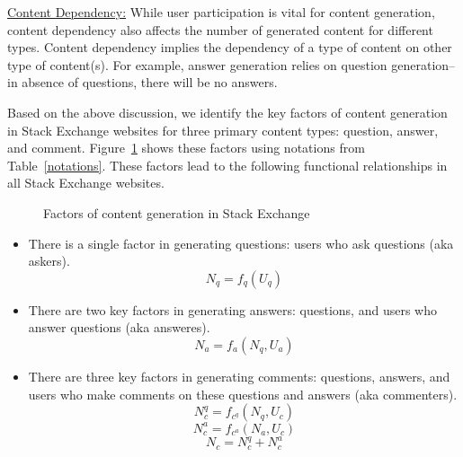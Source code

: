 \uline{Content Dependency:} While user participation is vital for content generation, content dependency also affects the number of generated content for different types. Content dependency implies the dependency of a type of content on other type of content(s). For example, answer generation relies on question generation-- in absence of questions, there will be no answers. %

Based on the above discussion, we identify the key factors of content generation in Stack Exchange websites for three primary content types: question, answer, and comment. Figure~\ref{content_factors} shows these factors using notations from Table~\ref{notations}. These factors lead to the following functional relationships in all Stack Exchange websites.

\begin{figure}[hbt]
  \centering
  \caption{Factors of content generation in Stack Exchange}
  \label{content_factors}
\end{figure}

\begin{itemize}
\item There is a single factor in generating questions: users who ask questions (aka askers).
\begin{equation*}
N_q = f_q(U_q)
\end{equation*}
\item There are two key factors in generating answers: questions, and users who answer questions (aka answeres). 
\begin{equation*}
N_a = f_a(N_q, U_a)
\end{equation*}
\item There are three key factors in generating comments: questions, answers, and users who make comments on these questions and answers (aka commenters). 
\begin{equation*}
N_c^q = f_{c^q}(N_q, U_c)
\end{equation*}
\begin{equation*}
N_c^a = f_{c^a}(N_a, U_c)
\end{equation*}
\begin{equation*}
N_c = N_c^q + N_c^a
\end{equation*}
\end{itemize}

